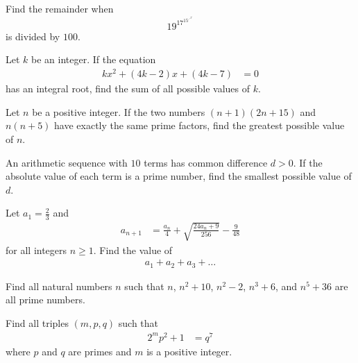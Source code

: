 \documentclass[problems.tex]{subfile}
\begin{document}
	\begin{problem}
		Find the remainder when $$19^{17^{15^{\iddots^{3^{1}}}}}$$ is divided by $100$.
	\end{problem}

	\begin{problem}
		Let $k$ be an integer. If the equation
			\begin{align*}
				kx^2 + (4k - 2)x + (4k - 7)
					& = 0
			\end{align*}
		has an integral root, find the sum of all possible values of $k$.
	\end{problem}

	\begin{problem}
		Let $n$ be a positive integer. If the two numbers $(n + 1)(2n + 15)$ and $n(n + 5)$ have exactly the same prime factors, find the greatest possible value of $n$.
	\end{problem}

	\begin{problem}
		An arithmetic sequence with $10$ terms has common difference $d > 0$. If the absolute value of each term is a prime number, find the smallest possible value of $d$.
	\end{problem}

	\begin{problem}
		Let $a_1 = \frac{2}{3}$ and
			\begin{align*}
				a_{n+1}
					&= \frac{a_n}{4} + \sqrt{\frac{24a_n+9}{256}} - \frac{9}{48}
			\end{align*}
		for all integers $n \geq 1$. Find the value of
			\begin{align*}
				a_1+a_2+a_3+\dots
			\end{align*}
	\end{problem}

	\begin{problem}
		Find all natural numbers $n$ such that $n$, $n^2+10$, $n^2-2$, $n^3+6$, and $n^5+36$ are all prime numbers. %
	\end{problem}

	\begin{problem}
		Find all triples $(m,p,q)$ such that
			\begin{align*}
				2^mp^2 +1
					& = q^7
			\end{align*}
		where $p$ and $q$ are primes and $m$ is a positive integer. %
	\end{problem}
\end{document}
